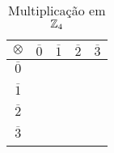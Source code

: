 \documentclass{beamer}
\begin{document}
    \begin{frame}
        \begin{exemplo}
                \begin{table}[!htb]
                    \caption{Multiplica\c{c}\~ao em $\mathbb{Z}_4$}
                    \hskip-6.0cm
                    \begin{tabular}{|c|c|c|c|c|} 
                      \hline
                      $\otimes$ & $\overline{0}$ & $\overline{1}$ & $\overline{2}$ & $\overline{3}$\T\\
                      \hline
                      $\overline{0}$ & \phantom{abc} & \phantom{abc} & \phantom{abc} & \phantom{abc}\T\\
                      & & & &\\
                      \hline
                      $\overline{1}$ & \phantom{abc} & \phantom{abc} & \phantom{abc} & \phantom{abc}\T\\
                      & & & &\\
                      \hline
                      $\overline{2}$ & \phantom{abc} & \phantom{abc} & \phantom{abc} & \phantom{abc}\T\\
                      & & & &\\
                      \hline
                      $\overline{3}$ & \phantom{abc} & \phantom{abc} & \phantom{abc} & \phantom{abc}\T\\
                      & & & &\\
                      \hline
                    \end{tabular}
                \end{table}
            \vspace{2cm}
        \end{exemplo}
    \end{frame}
\end{document}
